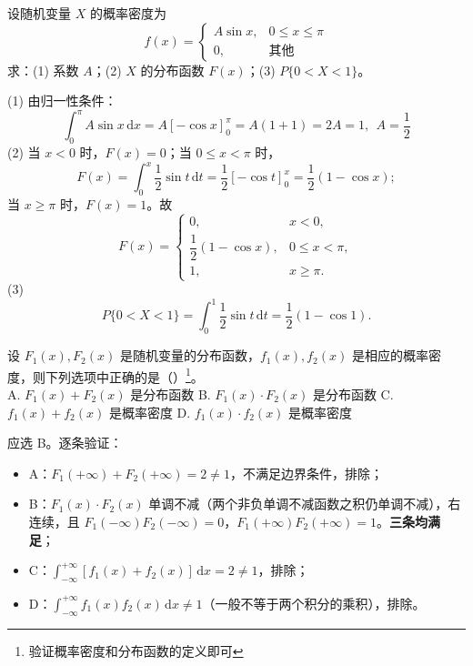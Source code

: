 ﻿\documentclass[lang=cn,11pt]{elegantbook}
\begin{document}
\begin{exercise}\label{exer:2-24}
设随机变量 $X$ 的概率密度为
\[
f(x) = \begin{cases} A\sin x, & 0 \le x \le \pi \\ 0, & \text{其他} \end{cases}
\]
求：(1) 系数 $A$；(2) $X$ 的分布函数 $F(x)$；(3) $P\{0<X<1\}$。
\end{exercise}
\begin{solution}
(1) 由归一性条件：
\[
\int_{0}^{\pi} A\sin x\,\mathrm{d}x = A[-\cos x]_{0}^{\pi} = A(1+1) = 2A = 1,~~A = \dfrac{1}{2}
\]
(2) 当 $x < 0$ 时，$F(x) = 0$；当 $0 \le x < \pi$ 时，
\[
F(x) = \int_{0}^{x} \frac{1}{2}\sin t\,\mathrm{d}t = \frac{1}{2}[-\cos t]_{0}^{x} = \frac{1}{2}(1-\cos x);
\]
当 $x \ge \pi$ 时，$F(x) = 1$。故
\[
F(x) = \begin{cases}
0, & x<0, \\[6pt]
\dfrac{1}{2}(1-\cos x), & 0 \le x < \pi, \\[6pt]
1, & x \ge \pi.
\end{cases}
\]
(3)
\[
P\{0<X<1\} = \int_{0}^{1} \frac{1}{2}\sin t\,\mathrm{d}t = \frac{1}{2}(1-\cos 1).
\]
\end{solution}



\begin{exercise}\label{exer:2-8}
设 $F_1(x), F_2(x)$ 是随机变量的分布函数，$f_1(x), f_2(x)$ 是相应的概率密度，则下列选项中正确的是（\quad）\footnote{验证概率密度和分布函数的定义即可}。\\
A. $F_1(x) + F_2(x)$ 是分布函数\quad
B. $F_1(x) \cdot F_2(x)$ 是分布函数\quad
C. $f_1(x) + f_2(x)$ 是概率密度\quad
D. $f_1(x) \cdot f_2(x)$ 是概率密度
\end{exercise}
\begin{solution}
应选 B。逐条验证：
\begin{itemize}
    \item A：$F_1(+\infty) + F_2(+\infty) = 2 \neq 1$，不满足边界条件，排除；
    \item B：$F_1(x) \cdot F_2(x)$ 单调不减（两个非负单调不减函数之积仍单调不减），右连续，且 $F_1(-\infty)F_2(-\infty) = 0$，$F_1(+\infty)F_2(+\infty) = 1$。\textbf{三条均满足}；
    \item C：$\displaystyle\int_{-\infty}^{+\infty}[f_1(x) + f_2(x)]\,\mathrm{d}x = 2 \neq 1$，排除；
    \item D：$\displaystyle\int_{-\infty}^{+\infty} f_1(x)f_2(x)\,\mathrm{d}x \neq 1$（一般不等于两个积分的乘积），排除。
\end{itemize}
\end{solution}
\end{document}
